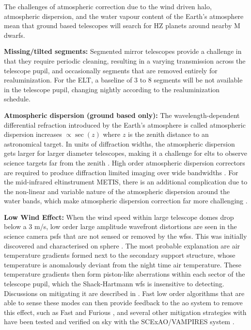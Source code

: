 \documentclass[letterpaper]{ar-1col}
\begin{document}
The challenges of atmospheric correction due to the wind driven halo, atmospheric dispersion, and the water vapour content of the Earth's atmosphere mean that ground based telescopes will search for HZ planets around nearby M dwarfs.

{\bf Missing/tilted segments:} Segmented mirror telescopes provide a challenge in that they require periodic cleaning, resulting in a varying transmission across the telescope pupil, and occasionally segments that are removed entirely for realuminization.
%
For the ELT, a baseline of 3 to 8 segments will be not available in the telescope pupil, changing nightly according to the realuminization schedule.

{\bf Atmospheric dispersion (ground based only):} The wavelength-dependent differential refraction introduced by the Earth's atmosphere is called atmospheric dispersion increases $\propto \sec(z)$ where $z$ is the zenith distance to an astronomical target.
%
In units of diffraction widths, the atmospheric dispersion gets larger for larger diameter telescopes, making it a challenge for \acp{elt} to observe science targets far from the zenith \citep{Kendrew08,Skemer09,van2020quantification}.
%
High order atmospheric dispersion correctors are required to produce diffraction limited imaging over wide bandwidths \citep{Kopon13}.
%
For the mid-infrared \ac{elt}instrument METIS, there is an additional complication due to the non-linear and variable nature of the atmospheric dispersion around the water bands, which make atmospheric dispersion correction far more challenging \citep{Absil22}.

{\bf Low Wind Effect: } When the wind speed within large telescope domes drop below a 3 m/s, low order large amplitude wavefront distortions are seen in the science camera \acp{psf} that are not sensed or removed by the \acp{wfs}.
%
This was initially discovered and characterised on \ac{sphere} \citep{Sauvage16}.
%
The most probable explanation are air temperature gradients formed next to the secondary support structure, whose temperature is anomalously deviant from the night time air temperature.
%
These temperature gradients then form piston-like aberrations within each sector of the telescope pupil, which the Shack-Hartmann \ac{wfs} is insensitive to detecting.
%
Discussions on mitigating it are described in \citet{Milli18}.
%
Fast low order algorithms that are able to sense these modes can then provide feedback to the \ac{ao} system to remove this effect, such as Fast and Furious \citep{Wilby18}, and several other mitigation strategies with have been tested and verified on sky with the SCExAO/VAMPIRES system \citep{Vievard19}.
\end{document}
